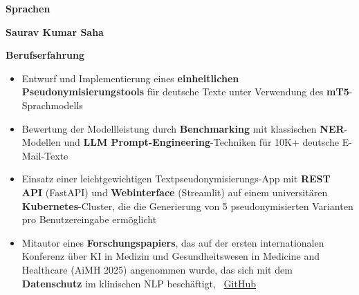 \documentclass[10pt,a4paper,ragged2e,withhyper]{altacv}
\renewcommand{\cvsectionfont}{\Large\sffamily\bfseries}
\renewcommand{\divider}{\textcolor{PastelRed!50}{\hdashrule{1.015\linewidth}{0.6pt}{0.6ex}}\medskip}
\renewcommand{\cvsection}[2][]{%
  \nointerlineskip\bigskip%
  \ifstrequal{#1}{}{}{\marginpar{\vspace*{\dimexpr1pt-\baselineskip}\raggedright}}%
  {\color{heading}\cvsectionfont{#2}}\\[-1ex]%
  \makebox[0pt][l]{\color{headingrule}\rule{\dimexpr\linewidth+0.25cm}{1pt}}\par\medskip
}
\begin{document}
\begin{paracol}{2}
\vspace{1.5em}

\cvsection{Sprachen}

\vspace{1em}

\vspace{1em}



\switchcolumn

\begin{flushleft}
  {\Huge\bfseries\textcolor{PastelRed}{Saurav Kumar Saha}}\\[1pt]
\end{flushleft}
\vspace{1em}


\cvsection{Berufserfahrung}

\begin{itemize}
\item \justifying Entwurf und Implementierung eines \textbf{einheitlichen Pseudonymisierungstools} für deutsche Texte unter Verwendung des \textbf{mT5}-Sprachmodells
\item \justifying Bewertung der Modellleistung durch \textbf{Benchmarking} mit klassischen \textbf{NER}-Modellen und \textbf{LLM Prompt-Engineering}-Techniken für 10K+ deutsche E-Mail-Texte
\item \justifying Einsatz einer leichtgewichtigen Textpseudonymisierungs-App mit \textbf{REST API} (FastAPI) und \textbf{Webinterface} (Streamlit) auf einem universitären \textbf{Kubernetes}-Cluster, die die Generierung von 5 pseudonymisierten Varianten pro Benutzereingabe ermöglicht
\item \justifying Mitautor eines \textbf{Forschungspapiers}, das auf der ersten internationalen Konferenz über KI in Medizin und Gesundheitswesen in Medicine and Healthcare (AiMH 2025) angenommen wurde, das sich mit dem \textbf{Datenschutz} im klinischen NLP beschäftigt, \faGithub\ \href{https://github.com/calgo-lab/pseugc}{GitHub}
\end{itemize}

\vspace{0.75em}

\divider


\end{paracol}
\end{document}
